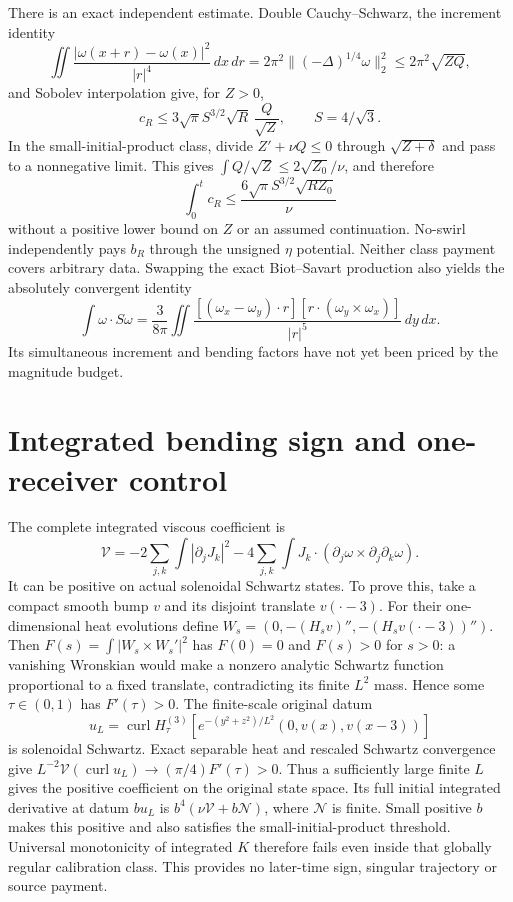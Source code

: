 \documentclass[11pt]{article}
\begin{document}
There is an exact independent estimate. Double Cauchy--Schwarz,
the increment identity
\[
 \iint\frac{|\omega(x+r)-\omega(x)|^2}{|r|^4}\,dx\,dr
 =2\pi^2\|(-\Delta)^{1/4}\omega\|_2^2\le2\pi^2\sqrt{ZQ},
\]
and Sobolev interpolation give, for $Z>0$,
\[
 c_R\le3\sqrt\pi S^{3/2}\sqrt R\,\frac Q{\sqrt Z},
 \qquad S=4/\sqrt3.
\]
In the small-initial-product class, divide $Z'+\nu Q\le0$ through
$\sqrt{Z+\delta}$ and pass to a nonnegative limit. This gives
$\int Q/\sqrt Z\le2\sqrt{Z_0}/\nu$, and therefore
\[
 \int_0^t c_R\le\frac{6\sqrt\pi S^{3/2}\sqrt{RZ_0}}\nu
\]
without a positive lower bound on $Z$ or an assumed continuation.
No-swirl independently pays $b_R$ through the unsigned $\eta$ potential.
Neither class payment covers arbitrary data. Swapping the exact
Biot--Savart production also yields the absolutely convergent identity
\[
 \int\omega\cdot S\omega
 =\frac3{8\pi}\iint
 \frac{[(\omega_x-\omega_y)\cdot r]
       [r\cdot(\omega_y\times\omega_x)]}{|r|^5}\,dy\,dx.
\]
Its simultaneous increment and bending factors have not yet been
priced by the magnitude budget.

\section{Integrated bending sign and one-receiver control}
The complete integrated viscous coefficient is
\[
 \mathcal V=-2\sum_{j,k}\int|\partial_jJ_k|^2
 -4\sum_{j,k}\int J_k\cdot
       (\partial_j\omega\times\partial_j\partial_k\omega).
\]
It can be positive on actual solenoidal Schwartz states. To prove this,
take a compact smooth bump $v$ and its disjoint translate $v(\cdot-3)$.
For their one-dimensional heat evolutions define
$W_s=(0,-(H_sv)'',-(H_sv(\cdot-3))'')$.
Then $F(s)=\int|W_s\times W_s'|^2$ has $F(0)=0$ and $F(s)>0$
for $s>0$: a vanishing Wronskian would make a nonzero analytic
Schwartz function proportional to a fixed translate, contradicting
its finite $L^2$ mass. Hence some $\tau\in(0,1)$ has $F'(\tau)>0$.
The finite-scale original datum
\[
 u_L=\operatorname{curl}H_\tau^{(3)}
 \left[e^{-(y^2+z^2)/L^2}(0,v(x),v(x-3))\right]
\]
is solenoidal Schwartz. Exact separable heat and rescaled Schwartz
convergence give $L^{-2}\mathcal V(\operatorname{curl}u_L)
\to(\pi/4)F'(\tau)>0$. Thus a sufficiently large finite $L$ gives
the positive coefficient on the original state space.
Its full initial integrated derivative at datum $b u_L$ is
$b^4(\nu\mathcal V+b\mathcal N)$, where $\mathcal N$ is finite.
Small positive $b$ makes this positive and also satisfies the
small-initial-product threshold. Universal monotonicity of integrated
$K$ therefore fails even inside that globally regular calibration class.
This provides no later-time sign, singular trajectory or source payment.
\end{document}
